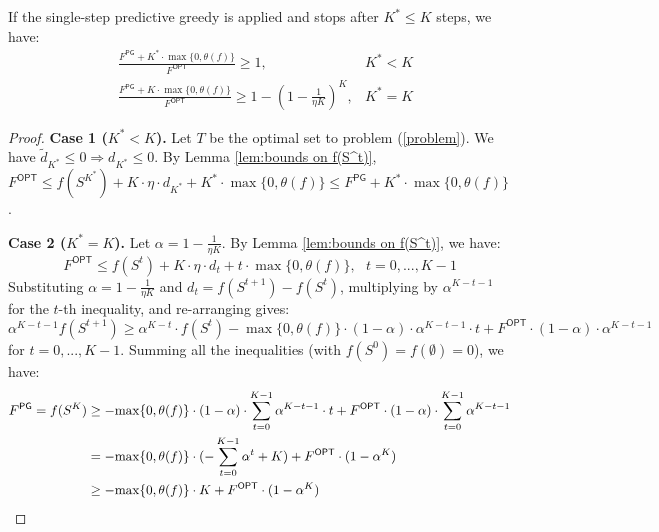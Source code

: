\begin{theorem}  \label{thm:bounds-on-SPG}
If the single-step predictive greedy is applied and stops after $K^* \leq K$ steps, we have:
\begin{align*}
& \frac{F^{\textsf{PG}} + K^* \cdot \max \{ 0, \theta(f) \}}{F^{\textsf{OPT}}} \geq 1,           & K^* < K\\
& \frac{F^{\textsf{PG}} + K \cdot \max \{ 0, \theta(f) \}}{F^{\textsf{OPT}}} \geq 1 - (1 - \frac{1}{\eta K})^K,  & K^* = K
\end{align*}
\end{theorem}
\begin{proof}
\textbf{Case 1 ($K^* < K$).} Let $T$ be the optimal set to problem (\ref{problem}). We have $\tilde{d}_{K^*} \leq 0 \Rightarrow {d}_{K^*} \leq 0$. By Lemma \ref{lem:bounds on f(S^t)}, $F^{\textsf{OPT}} \leq f(S^{K^*}) + K \cdot \eta \cdot d_{K^*} + K^* \cdot \max \{ 0, \theta(f) \} \leq F^{\textsf{PG}} + K^* \cdot \max \{ 0, \theta(f) \}$.

\textbf{Case 2 ($K^* = K$).} Let $\alpha = 1 - \frac{1}{\eta K}$. By Lemma \ref{lem:bounds on f(S^t)}, we have:
\[ F^{\textsf{OPT}} \leq f(S^t) + K \cdot \eta \cdot d_{t} + t \cdot \max \{ 0, \theta(f) \}, ~~~ t = 0, ..., K-1 \]
Substituting $\alpha = 1 - \frac{1}{\eta K}$ and $d_t = f(S^{t+1}) - f(S^t)$, multiplying by $\alpha^{K-t-1}$ for the $t$-th inequality, and re-arranging gives:
\[ \alpha^{K-t-1} f(S^{t+1}) \geq \alpha^{K-t} \cdot f(S^t) - {\max \{ 0, \theta(f) \}} \cdot (1 - \alpha) \cdot \alpha^{K-t-1} \cdot t + {F^{\textsf{OPT}}} \cdot (1 - \alpha) \cdot \alpha^{K-t-1} \]
for $t = 0, ..., K-1$. Summing all the inequalities (with $f(S^0) = f(\emptyset) = 0$), we have:
\begin{align*}
    F^{\textsf{PG}} = f(S^K) &\geq - {\max \{ 0, \theta(f) \}} \cdot (1 - \alpha) \cdot \sum_{t=0}^{K-1}{\alpha^{K-t-1} \cdot t} + {F^{\textsf{OPT}}} \cdot (1 - \alpha) \cdot \sum_{t=0}^{K-1}{\alpha^{K-t-1}} \\
    &= - {\max \{ 0, \theta(f) \}} \cdot (-\sum_{t=0}^{K-1}{\alpha^t} + K) + F^{\textsf{OPT}} \cdot (1 - \alpha^K) \\
    &\geq - {\max \{ 0, \theta(f) \}} \cdot K + F^{\textsf{OPT}} \cdot (1 - \alpha^K) \qedhere
\end{align*}
\end{proof}

